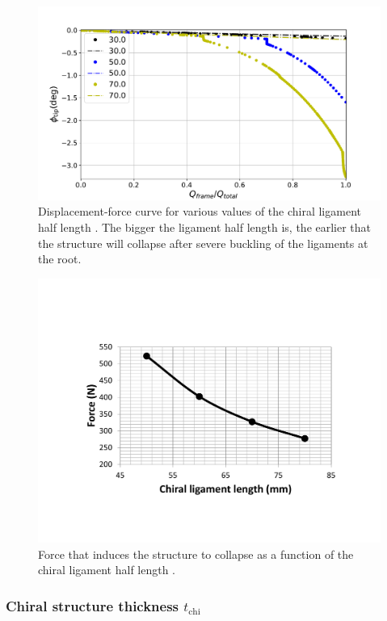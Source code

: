       \begin{figure}[!htpb] %
        \centering
        \includegraphics[width=0.8 \textwidth]{figures/../figures/result-sim/L/force_displacement-far}
        \caption[Displacement-force curve for various values of the chiral ligament half length]{Displacement-force curve for various values of the chiral ligament half length \chiL. The bigger the ligament half length is, the earlier that the structure will collapse after severe buckling of the ligaments at the root.}\label{fig:forceDisplacement-far-L}
      \end{figure}

      \begin{figure}[!htpb] %
        \centering
        \includegraphics[width=0.8 \textwidth]{figures/../figures/result-sim/L/force_L}
        \caption[Force that induces the structure to collapse as a function of the chiral ligament half length]{Force that induces the structure to collapse as a function of the chiral ligament half length \chiL.}\label{fig:force_L}
      \end{figure}

    \clearpage
    \subsubsection{Chiral structure thickness $t_{\mathrm{chi}}$}

